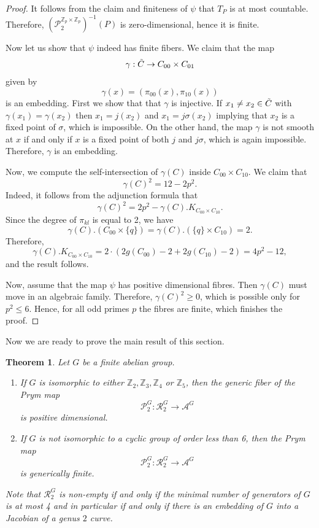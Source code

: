 \documentclass{amsart}
\newtheorem{thm}{Theorem}[section]
\theoremstyle{remark}
\numberwithin{equation}{section}
\begin{document}
\begin{proof}
It follows from the claim and finiteness of $\psi$ that $T_P$ is at most countable. Therefore, $(\mathcal{P}_2^{\mathbb{Z}_p \times \mathbb{Z}_p})^{-1}(P)$ is zero-dimensional, hence it is finite.

Now let us show that $\psi$ indeed has finite fibers. We claim that the map $$\gamma: \Tilde{C} \to C_{00} \times C_{01}$$ given by $$\gamma(x) = (\pi_{00}(x), \pi_{10}(x))$$ is an embedding. First we show that that $\gamma$ is injective. If $x_1 \neq x_2 \in \Tilde{C}$ with $\gamma(x_1) = \gamma(x_2)$ then $x_1 = j(x_2)$ and $x_1 = j\sigma(x_2)$ implying that $x_2$ is a fixed point of $\sigma$, which is impossible. 
On the other hand, the map $\gamma$ is not smooth at $x$ if and only if $x$ is a fixed point of both $j$ and $j\sigma$, which is again impossible. Therefore, $\gamma$ is an embedding.

Now, we compute the self-intersection of $\gamma(C)$ inside $C_{00} \times C_{10}$. We claim that 
$$\gamma(C)^2 = 12 - 2p^2.$$
Indeed, it follows from the adjunction formula that $$\gamma(C)^2 = 2p^2 - \gamma(C).K_{C_{00} \times C_{10}}.$$ Since the degree of $\pi_{kl}$ is equal to 2, we have $$\gamma(C).(C_{00} \times \{q\}) = \gamma(C).(\{q\} \times C_{10}) = 2.$$ Therefore, $$\gamma(C).K_{C_{00} \times C_{10}} = 2 \cdot (2g(C_{00}) - 2 + 2g(C_{10}) - 2) = 4p^2 - 12,$$ and the result follows.

Now, assume that the map $\psi$ has positive dimensional fibres. Then $\gamma(C)$ must move in an algebraic family. Therefore, $\gamma(C)^2 \geq 0$, which is possible only for $p^2 \leq 6$. Hence, for all odd primes $p$ the fibres are finite, which finishes the proof.
\end{proof}



Now we are ready to prove the main result of this section. 
\begin{thm}
\label{thmabel}
    Let $G$ be a finite abelian group.
    \begin{enumerate}
        \item If $G$ is isomorphic to either $\mathbb{Z}_2, \mathbb{Z}_3, \mathbb{Z}_4$ or $\mathbb{Z}_5$, then the generic fiber of the Prym map $$\mathcal{P}_2^{G}: \mathcal{R}_2^{G} \to \mathcal{A}^{G}$$ is positive dimensional. 
        \item If $G$ is not isomorphic to a cyclic group of order less than 6, then the Prym map $$\mathcal{P}_2^{G}: \mathcal{R}_2^{G} \to \mathcal{A}^{G}$$ is generically finite. 
    \end{enumerate}
    Note that $\mathcal{R}_2^{G}$ is non-empty if and only if the minimal number of generators of $G$ is at most 4 and in particular if and only if there is an embedding of $G$ into a Jacobian of a genus $2$ curve.
\end{thm}
\end{document}
